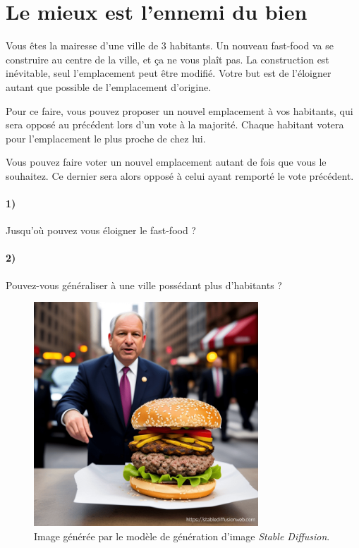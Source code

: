 \documentclass[a4paper,10pt,oneside]{article}
\begin{document}
\section{Le mieux est l'ennemi du bien}

Vous êtes la mairesse d'une ville de 3 habitants.
Un nouveau fast-food va se construire au centre de la ville, et ça ne vous plaît pas.
La construction est inévitable, seul l'emplacement peut être modifié.
Votre but est de l'éloigner autant que possible de l'emplacement d'origine.

Pour ce faire, vous pouvez proposer un nouvel emplacement à vos habitants, qui sera opposé au précédent lors d'un vote à la majorité.
Chaque habitant votera pour l'emplacement le plus proche de chez lui.

Vous pouvez faire voter un nouvel emplacement autant de fois que vous le souhaitez.
Ce dernier sera alors opposé à celui ayant remporté le vote précédent.


\paragraph*{1)} 
Jusqu'où pouvez vous éloigner le fast-food ?

\paragraph*{2)} 
Pouvez-vous généraliser à une ville possédant plus d'habitants ?


\vspace{3cm}
\begin{figure}[!ht]
  \centering
  \includegraphics[width=0.75\textwidth]{figures/fast-food.png}
  \caption*{Image générée par le modèle de génération d'image \textit{Stable Diffusion}.}
\end{figure}
\end{document}
